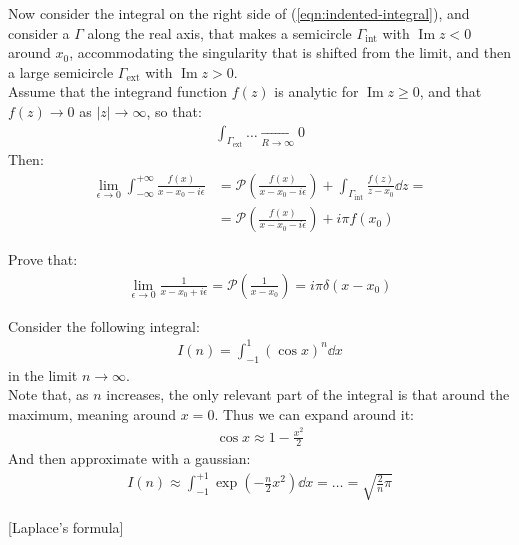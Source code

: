 \documentclass[../template.tex]{subfiles}
\begin{document}
Now consider the integral on the right side of (\ref{eqn:indented-integral}), and consider a $\Gamma$ along the real axis, that makes a semicircle $\Gamma_{\mathrm{int} }$  with $\operatorname{Im} z < 0$ around $x_0$, accommodating the singularity that is shifted from the limit, and then a large semicircle $\Gamma_{\mathrm{ext}}$ with $\operatorname{Im}z > 0$.\\
Assume that the integrand function $f(z)$ is analytic for $\operatorname{Im} z \geq 0$, and that $f(z) \to 0$ as $|z| \to \infty$, so that:
\begin{align*}
    \int_{\Gamma_{\mathrm{ext} }} \dots  \xrightarrow[R \to \infty]{}  0
\end{align*}
Then:
\begin{align*}
    \lim_{\epsilon \to 0} \int_{-\infty}^{+\infty} \frac{f(x)}{x-x_0 - i \epsilon} &=\mathcal{P}\left(\frac{f(x)}{x- x_0 - i \epsilon} \right) + \int_{\Gamma_{\mathrm{int} }} \frac{f(z)}{z-x_0} \dd{z} =\\
    &= \mathcal{P}\left(\frac{f(x)}{x- x_0 - i \epsilon} \right) + i \pi f(x_0) 
\end{align*}

\begin{exo}
    Prove that:
    \begin{align*}
        \lim_{\epsilon \to 0} \frac{1}{x- x_0 + i \epsilon} = \mathcal{P}\left(\frac{1}{x- x_0} \right)  = i \pi \delta(x- x_0)
    \end{align*}
\end{exo}

\begin{example}
Consider the following integral:
\begin{align*}
    I(n) = \int_{-1}^{1} (\cos x)^n \dd{x}
\end{align*}
in the limit $n \to \infty$.\\
Note that, as $n$ increases, the only relevant part of the integral is that around the maximum, meaning around $x = 0$. Thus we can expand around it:
\begin{align*}
    \cos x \approx 1 - \frac{x^2}{2} 
\end{align*}  
And then approximate with a gaussian:
\begin{align*}
    I(n) \approx \int_{-1}^{+1} \exp\left(-\frac{n}{2} x^2 \right)\dd{x} = \dots = \sqrt{\frac{2}{n} \pi }
\end{align*}

\end{example}[Laplace's formula]
\end{document}
